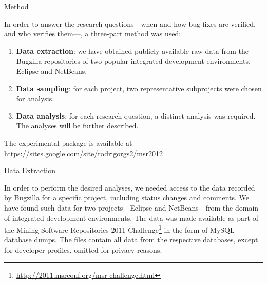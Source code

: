 \begin{section}{Method} \label{sec:methods}


	In order to answer the research questions---when and how bug fixes are verified, and who verifies them---, a three-part method was used:
	
	\begin{enumerate}
		\item \textbf{Data extraction}: we have obtained publicly available raw data from the Bugzilla repositories of two popular integrated development environments, Eclipse and NetBeans.

		\item \textbf{Data sampling}: for each project, two representative subprojects were chosen for analysis.
		
		
		
		\item \textbf{Data analysis}: for each research question, a distinct analysis was required. The analyses will be further described.
	\end{enumerate}	
	
	The experimental package is available at \\ \url{https://sites.google.com/site/rodrigorgs2/msr2012}

\begin{subsection}{Data Extraction}
	
	In order to perform the desired analyses, we needed access to the data recorded by Bugzilla for a specific project, including status changes and comments. We have found such data for two projects---Eclipse and NetBeans---from the domain of integrated development environments. The data was made available as part of the Mining Software Repositories 2011 Challenge\footnote{\url{http://2011.msrconf.org/msr-challenge.html}} in the form of MySQL database dumps. The files contain all data from the respective databases, except for developer profiles, omitted for privacy reasons.
	

\end{subsection}
\end{section}
